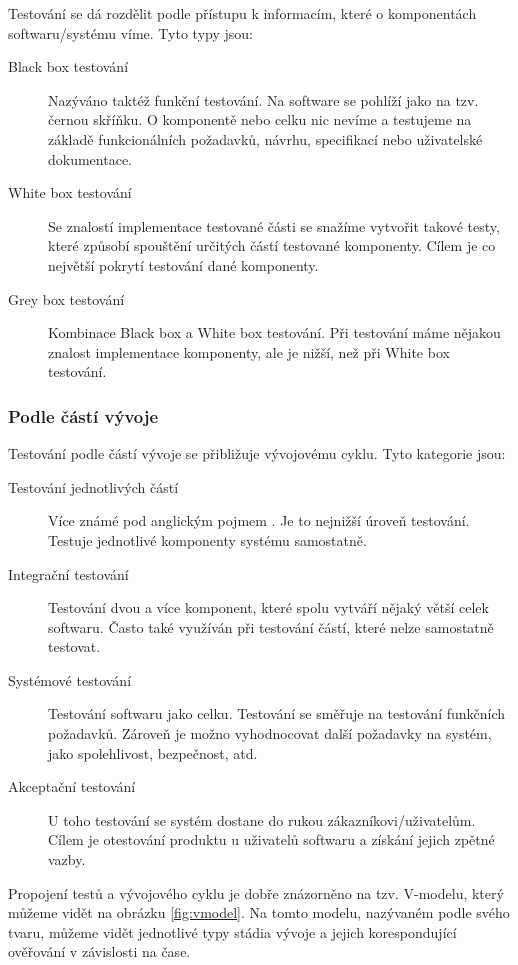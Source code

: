 Testování se dá rozdělit podle přístupu k informacím, které o komponentách softwaru/systému víme. Tyto typy jsou:

\begin{description}
    \item[Black box testování] Nazýváno taktéž funkční testování. Na software se pohlíží jako na tzv. černou skříňku. O komponentě nebo celku nic nevíme a testujeme na základě funkcionálních požadavků, návrhu, specifikací nebo uživatelské dokumentace. 
    \item[White box testování] Se znalostí implementace testované části se snažíme vytvořit takové testy, které způsobí spouštění určitých částí testované komponenty. Cílem je co největší pokrytí testování dané komponenty.
    \item[Grey box testování] Kombinace Black box a White box testování. Při testování máme nějakou znalost implementace komponenty, ale je nižší, než při White box testování. \cite{khan2010different}
\end{description}

\subsubsection{Podle částí vývoje}

Testování podle částí vývoje se přibližuje vývojovému cyklu. Tyto kategorie jsou:  

\begin{description}
    \item[Testování jednotlivých částí] Více známé pod anglickým pojmem . Je to nejnižší úroveň testování. Testuje jednotlivé komponenty systému samostatně.
    \item[Integrační testování] Testování dvou a více komponent, které spolu vytváří nějaký větší celek softwaru. Často také využíván při testování částí, které nelze samostatně testovat.
    \item[Systémové testování] Testování softwaru jako celku. Testování se směřuje na testování funkčních požadavků. Zároveň je možno vyhodnocovat další požadavky na systém, jako spolehlivost, bezpečnost, atd.
    \item[Akceptační testování] U toho testování se systém dostane do rukou zákazníkovi/uživatelům. Cílem je otestování produktu u uživatelů softwaru a získání jejich zpětné vazby. 
\end{description}

Propojení testů a vývojového cyklu je dobře znázorněno na tzv. V-modelu, který můžeme vidět na obrázku \ref{fig:vmodel}. Na tomto modelu, nazývaném podle svého tvaru, můžeme vidět jednotlivé typy stádia vývoje a jejich korespondující ověřování v závislosti na čase.

